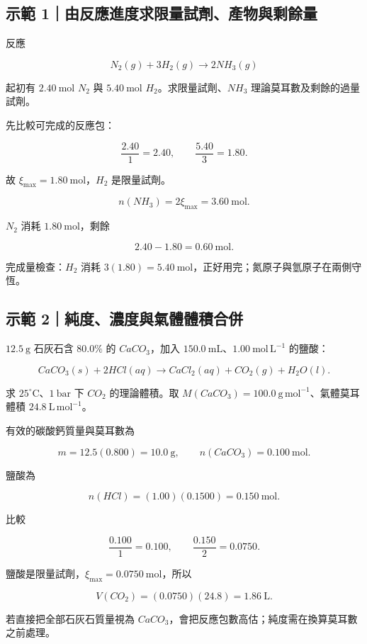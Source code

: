 \documentclass[11pt,a4paper]{article}
\begin{document}
\begin{HandoutWorkedExample}

\subsection{示範 1｜由反應進度求限量試劑、產物與剩餘量}\label{ux793aux7bc4-1ux7531ux53cdux61c9ux9032ux5ea6ux6c42ux9650ux91cfux8a66ux5291ux7522ux7269ux8207ux5269ux9918ux91cf}

反應

\[
N_2(g)+3H_2(g)\rightarrow2NH_3(g)
\]

起初有 \(2.40\ \mathrm{mol}\) \(N_2\) 與 \(5.40\ \mathrm{mol}\) \(H_2\)。求限量試劑、\(NH_3\) 理論莫耳數及剩餘的過量試劑。

先比較可完成的反應包：

\[
\frac{2.40}{1}=2.40,\qquad \frac{5.40}{3}=1.80.
\]

故 \(\xi_{\max}=1.80\ \mathrm{mol}\)，\(H_2\) 是限量試劑。

\[
n(NH_3)=2\xi_{\max}=3.60\ \mathrm{mol}.
\]

\(N_2\) 消耗 \(1.80\ \mathrm{mol}\)，剩餘

\[
2.40-1.80=0.60\ \mathrm{mol}.
\]

完成量檢查：\(H_2\) 消耗 \(3(1.80)=5.40\ \mathrm{mol}\)，正好用完；氮原子與氫原子在兩側守恆。

\end{HandoutWorkedExample}

\begin{HandoutWorkedExample}

\subsection{示範 2｜純度、濃度與氣體體積合併}\label{ux793aux7bc4-2ux7d14ux5ea6ux6fc3ux5ea6ux8207ux6c23ux9ad4ux9ad4ux7a4dux5408ux4f75}

\(12.5\ \mathrm g\) 石灰石含 \(80.0\%\) 的 \(CaCO_3\)，加入 \(150.0\ \mathrm{mL}\)、\(1.00\ \mathrm{mol\,L^{-1}}\) 的鹽酸：

\[
CaCO_3(s)+2HCl(aq)\rightarrow CaCl_2(aq)+CO_2(g)+H_2O(l).
\]

求 \(25^\circ\mathrm C\)、\(1\ \mathrm{bar}\) 下 \(CO_2\) 的理論體積。取 \(M(CaCO_3)=100.0\ \mathrm{g\,mol^{-1}}\)、氣體莫耳體積 \(24.8\ \mathrm{L\,mol^{-1}}\)。

有效的碳酸鈣質量與莫耳數為

\[
m=12.5(0.800)=10.0\ \mathrm g,\qquad n(CaCO_3)=0.100\ \mathrm{mol}.
\]

鹽酸為

\[
n(HCl)=(1.00)(0.1500)=0.150\ \mathrm{mol}.
\]

比較

\[
\frac{0.100}{1}=0.100,\qquad \frac{0.150}{2}=0.0750.
\]

鹽酸是限量試劑，\(\xi_{\max}=0.0750\ \mathrm{mol}\)，所以

\[
V(CO_2)=(0.0750)(24.8)=1.86\ \mathrm L.
\]

若直接把全部石灰石質量視為 \(CaCO_3\)，會把反應包數高估；純度需在換算莫耳數之前處理。

\end{HandoutWorkedExample}
\end{document}
